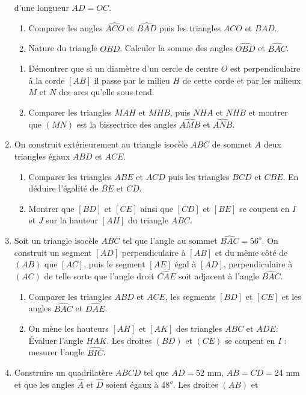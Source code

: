 \begin{enumerate}
d'une longueur $AD=OC$.\begin{enumerate}
\item Comparer les angles $\widehat{ACO}$ et $\widehat{BAD}$ puis les triangles $ACO$ et $BAD$. 
\item Nature du triangle $OBD$. Calculer la somme des angles $\widehat{OBD}$ et 
$\widehat{BAC}$. 
\end{enumerate}
\begin{enumerate}
\item Démontrer que si un diamètre d'un cercle de centre $O$ est perpendiculaire
à la corde $[AB]$ il passe par le milieu $H$ de cette corde et par les milieux $M$ 
et $N$ des arcs qu'elle sous-tend.
\item Comparer les triangles $MAH$ et $MHB$, puis $NHA$ et $NHB$ et montrer que 
$(MN)$ est la bissectrice des angles $\widehat{AMB}$ et $\widehat{ANB}$. 
\end{enumerate}
\item On construit extérieurement au triangle isocèle $ABC$ de sommet $A$ deux triangles égaux $ABD$ et $ACE$. \begin{enumerate}
\item Comparer les triangles $ABE$ et $ACD$ puis les triangles $BCD$ et $CBE$. En 
déduire l'égalité de $BE$ et $CD$. 
\item Montrer que $[BD]$ et $[CE]$ ainsi que $[CD]$ et $[BE]$ se coupent en $I$ 
et $J$ sur la hauteur $[AH]$ du triangle $ABC$. 
\end{enumerate}
\item Soit un triangle isocèle $ABC$ tel que l'angle au sommet $\widehat{BAC}=56^o$.
On construit un segment $[AD]$ perpendiculaire à $[AB]$ et du même côté de $(AB)$ que $[AC]$, puis le segment $[AE]$ égal à $[AD]$, perpendiculaire à $(AC)$ de telle sorte que l'angle droit $\widehat{CAE}$ soit adjacent à l'angle $\widehat{BAC}$. 
\begin{enumerate}
\item Comparer les triangles $ABD$ et $ACE$, les segments $[BD]$ et $[CE]$ et les
angles $\widehat{BAC}$ et $\widehat{DAE}$.
\item On mène les hauteurs $[AH]$ et $[AK]$ des triangles $ABC$ et $ADE$. Évaluer 
l'angle $HAK$. Les droites $(BD)$ et $(CE)$ se coupent en $I$ : mesurer l'angle $\widehat{BIC}$.
\end{enumerate}
\item Construire un quadrilatère $ABCD$ tel que $AD=52$ mm, $AB=CD=24$ mm et que les angles $\widehat{A}$ et $\widehat{D}$ soient égaux à $48^o$. Les droites $(AB)$ et 

\end{enumerate}
